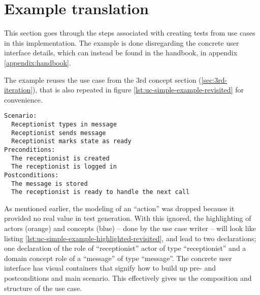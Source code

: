 \section{Example translation}
This section goes through the steps associated with creating tests from use cases in this implementation. The example is done disregarding the concrete user interface details, which can instead be found in the handbook, in appendix \ref{appendix:handbook}.\medskip

\noindent The example reuses the use case from the 3rd concept section (\ref{sec:3rd-iteration}), that is also repeated in figure \ref{lst:uc-simple-example-revisited} for convenience.

\begin{lstlisting}[frame=single,style=usecase, caption=Use case example revisited, label=lst:uc-simple-example-revisited]
Scenario:
  Receptionist types in message
  Receptionist sends message
  Receptionist marks state as ready 
Preconditions:
  The receptionist is created
  The receptionist is logged in
Postconditions:
  The message is stored
  The receptionist is ready to handle the next call
\end{lstlisting}
As mentioned earlier, the modeling of an ``action'' was dropped because it provided no real value in test generation. With this ignored, the highlighting of actors (orange) and concepts (blue) -- done by the use case writer -- will look like listing \ref{lst:uc-simple-example-highlighted-revisited}, and lead to two declarations; one declaration of the role of ``receptionist'' actor of type ``receptionist'' and a domain concept role of a ``message'' of type ``message''. The concrete user interface has visual containers that signify how to build up pre- and postconditions and main scenario. This effectively gives us the composition and structure of the use case.

